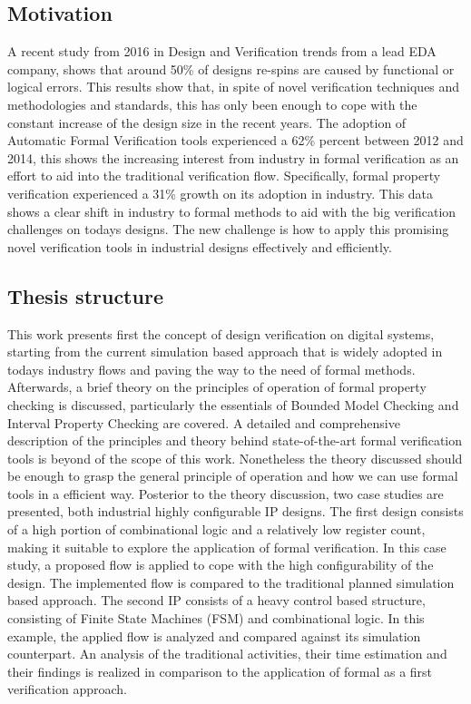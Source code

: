 \documentclass[a4paper,11pt]{article}
\begin{document}
\subsection{Motivation}
A recent study \cite{mentor:study} from 2016 in Design and Verification trends from a lead EDA company, shows that around 50\% of designs re-spins are caused by functional or logical errors. This results show that, in spite of novel verification techniques and methodologies and standards, this has only been enough to cope with the constant increase of the design size in the recent years. The adoption of Automatic Formal Verification tools experienced a 62\% percent between 2012 and 2014, this shows the increasing interest from industry in formal verification as an effort to aid into the traditional verification flow. Specifically, formal property verification experienced a 31\% growth on its adoption in industry. This data shows a clear shift in industry to formal methods to aid with the big verification challenges on todays designs. The new challenge is how to apply this promising novel verification tools in industrial designs effectively and efficiently.

\subsection{Thesis structure}
This work presents first the concept of design verification on digital systems, starting from the current simulation based approach that is widely adopted in todays industry flows and paving the way to the need of formal methods. Afterwards, a brief theory on the principles of operation of formal property checking is discussed, particularly the essentials of Bounded Model Checking and Interval Property Checking are covered. A detailed and comprehensive description of the principles and theory behind state-of-the-art formal verification tools is beyond of the scope of this work. Nonetheless the theory discussed should be enough to grasp the general principle of operation and how we can use formal tools in a efficient way. 
Posterior to the theory discussion, two case studies are presented, both industrial highly configurable IP designs. The first design consists of a high portion of combinational logic and a relatively low register count, making it suitable to explore the application of formal verification. In this case study, a proposed flow is applied to cope with the high configurability of the design. The implemented flow is compared to the traditional planned simulation based approach. The second IP consists of a heavy control based structure, consisting of Finite State Machines (FSM) and combinational logic. In this example, the applied flow is analyzed and compared against its simulation counterpart. An analysis of the traditional activities, their time estimation and their findings is realized in comparison to the application of formal as a first verification approach.
\pagebreak
\end{document}
